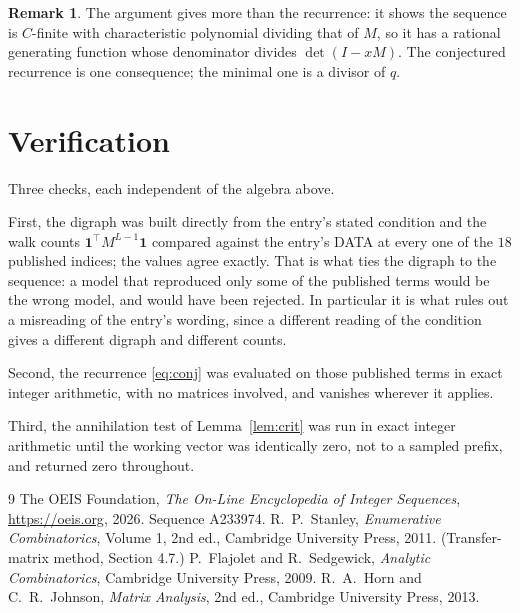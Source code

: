 \documentclass[11pt,a4paper]{article}
\theoremstyle{plain}
\theoremstyle{definition}
\newtheorem{remark}[theorem]{Remark}
\begin{document}
\begin{remark}
The argument gives more than the recurrence: it shows the sequence is $C$-finite with
characteristic polynomial dividing that of $M$, so it has a rational generating function
whose denominator divides $\det(I-xM)$. The conjectured recurrence is one consequence; the
minimal one is a divisor of $q$.
\end{remark}

\section{Verification}

Three checks, each independent of the algebra above.

First, the digraph was built directly from the entry's stated condition and the walk counts
$\mathbf{1}^{\!\top}M^{L-1}\mathbf{1}$ compared against the entry's DATA at
every one of the $18$ published indices; the values agree exactly. That is what ties
the digraph to the sequence: a model that reproduced only some of the published terms would
be the wrong model, and would have been rejected. In particular it is what rules out a
misreading of the entry's wording, since a different reading of the condition gives a
different digraph and different counts.

Second, the recurrence \eqref{eq:conj} was evaluated on those published terms in exact
integer arithmetic, with no matrices involved, and vanishes wherever it applies.

Third, the annihilation test of Lemma~\ref{lem:crit} was run in exact integer arithmetic
until the working vector was identically zero, not to a sampled prefix, and returned zero
throughout.

\begin{thebibliography}{9}
 The OEIS Foundation, \emph{The On-Line Encyclopedia of Integer
Sequences}, \url{https://oeis.org}, 2026. Sequence A233974.
 R.~P.~Stanley, \emph{Enumerative Combinatorics}, Volume 1, 2nd ed.,
Cambridge University Press, 2011. (Transfer-matrix method, Section 4.7.)
 P.~Flajolet and R.~Sedgewick, \emph{Analytic Combinatorics}, Cambridge
University Press, 2009.
 R.~A.~Horn and C.~R.~Johnson, \emph{Matrix Analysis}, 2nd ed., Cambridge
University Press, 2013.
\end{thebibliography}
\end{document}
